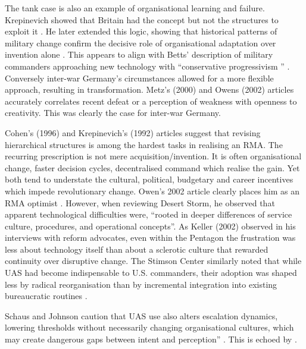 The tank case is also an example of organisational learning and failure. Krepinevich showed that Britain had the concept but not the structures to exploit it \parencite{KREPINEVICH_1992}. He later extended this logic, showing that historical patterns of military change confirm the decisive role of organisational adaptation over invention alone \parencite{KREPINEVICH_1994}. This appears to align with Betts' description of military commanders approaching new technology with ``conservative progressivism  '' \parencite{BETTS_1996}.  Conversely inter-war Germany's circumstances allowed for a more flexible approach, resulting in transformation. Metz's (2000) and Owens (2002) articles accurately correlates recent defeat or a perception of weakness with openness to creativity\nocite{METZ_2000,OWENS_2002}. This was clearly the case for inter-war Germany.



Cohen's (1996) and Krepinevich's (1992) articles suggest that revising hierarchical structures is among the hardest tasks in realising an RMA. The recurring prescription is not mere acquisition/invention. It is often organisational change, faster decision cycles, decentralised command which realise the gain. Yet both tend to understate the cultural, political, budgetary and career incentives which impede revolutionary change\nocite{COHEN_1995,COHEN_1996,KREPINEVICH_1992}. Owen's 2002 article clearly places him as an RMA optimist \nocite{OWENS_2002}. However, when reviewing Desert Storm, he observed that apparent technological difficulties were, ``rooted in deeper differences of service culture, procedures, and operational concepts''. As Keller (2002) observed in his interviews with reform advocates, even within the Pentagon the frustration was less about technology itself than about a sclerotic culture that rewarded continuity over disruptive change\nocite{KELLER_2002}. The Stimson Center similarly noted that while UAS had become indispensable to U.S. commanders, their adoption was shaped less by radical reorganisation than by incremental integration into existing bureaucratic routines \parencite{STIMSON_2015}.

 Schaus and Johnson caution that UAS use also alters escalation dynamics, lowering thresholds without necessarily changing organisational cultures, which may create dangerous gaps between intent and perception” \parencite{SCHAUS_2018}. This is echoed by \textcite{KREPINEVICH_1992}.


